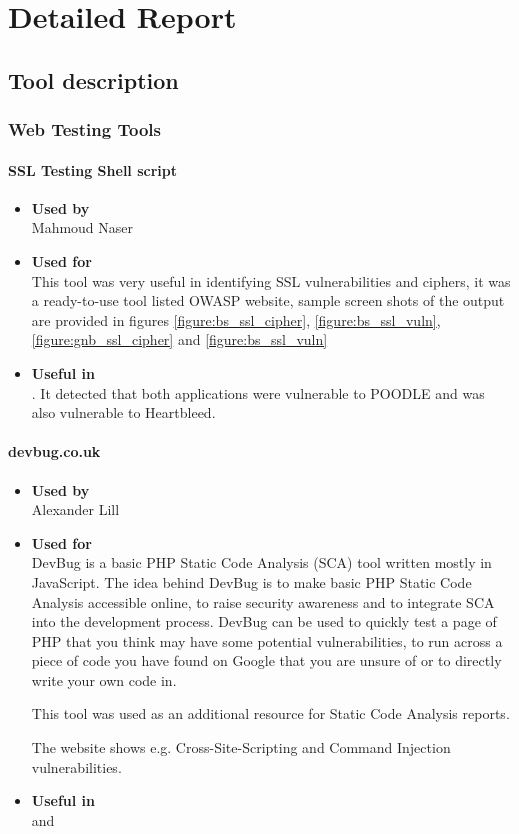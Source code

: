 \chapter{Detailed Report}\label{chapter:detailed_report}

\section{Tool description}

\subsection*{Web Testing Tools}

\subsubsection*{SSL Testing Shell script}
\begin{itemize}
	\item \textbf{Used by}\\ Mahmoud Naser
	\item \textbf{Used for}\\
	This tool was very useful in identifying SSL vulnerabilities and ciphers, it was a ready-to-use tool listed OWASP website, sample screen shots of the output are provided in figures \autoref{figure:bs_ssl_cipher}, \autoref{figure:bs_ssl_vuln}, \autoref{figure:gnb_ssl_cipher} and \autoref{figure:bs_ssl_vuln} 
	\item \textbf{Useful in}\\ .
	It detected that both applications were vulnerable to POODLE and \bs{} was also vulnerable to Heartbleed.
\end{itemize}

\subsubsection*{devbug.co.uk}
\begin{itemize}
	\item \textbf{Used by}\\ Alexander Lill
	\item \textbf{Used for}\\
	DevBug is a basic PHP Static Code Analysis (SCA) tool written mostly in JavaScript. The idea behind DevBug is to make basic PHP Static Code Analysis accessible online, to raise security awareness and to integrate SCA into the development process. DevBug can be used to quickly test a page of PHP that you think may have some potential vulnerabilities, to run across a piece of code you have found on Google that you are unsure of or to directly write your own code in.
	
	This tool was used as an additional resource for Static Code Analysis reports.
	
	The website shows e.g. Cross-Site-Scripting and Command Injection vulnerabilities.
	\item \textbf{Useful in}\\  and 
\end{itemize}

